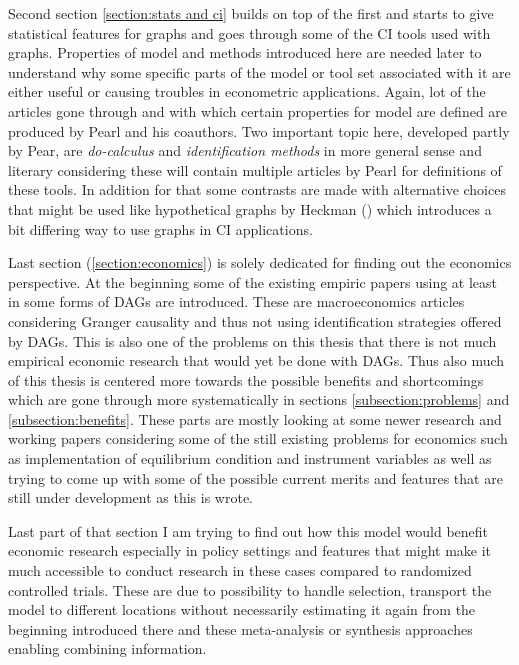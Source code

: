 \documentclass[main=english,12pt,a4paper,pdftex,econ,utf8]{aaltothesis}
\begin{document}
Second section \ref{section:stats and ci} builds on top of the first and starts to give statistical features for graphs and goes through some of the CI tools used with graphs. Properties of model and methods introduced here are needed later to understand why some specific parts of the model or tool set associated with it are either useful or causing troubles in econometric applications. Again, lot of the articles gone through and with which certain properties for model are defined are produced by Pearl and his coauthors. Two important topic here, developed partly by Pear, are \textit{do-calculus} and \textit{identification methods} in more general sense and literary considering these will contain multiple articles by Pearl for definitions of these tools. In addition for that some contrasts are made with alternative choices that might be used like hypothetical graphs by Heckman (\cite{Heckman2015}) which introduces a bit differing way to use graphs in CI applications.

Last section (\ref{section:economics}) is solely dedicated for finding out the economics perspective. At the beginning some of the existing empiric papers using at least in some forms of DAGs are introduced. These are macroeconomics articles considering Granger causality and thus not using identification strategies offered by DAGs. This is also one of the problems on this thesis that there is not much empirical economic research that would yet be done with DAGs. Thus also much of this thesis is centered more towards the possible benefits and shortcomings which are gone through more systematically in sections \ref{subsection:problems} and \ref{subsection:benefits}. These parts are mostly looking at some newer research and working papers considering some of the still existing problems for economics such as implementation of equilibrium condition and instrument variables as well as trying to come up with some of the possible current merits and features that are still under development as this is wrote.

Last part of that section I am trying to find out how this model would benefit economic research especially in policy settings and features that might make it much accessible to conduct research in these cases compared to randomized controlled trials. These are due to possibility to handle selection, transport the model to different locations without necessarily estimating it again from the beginning introduced there and these meta-analysis or synthesis approaches enabling combining information.
\end{document}
